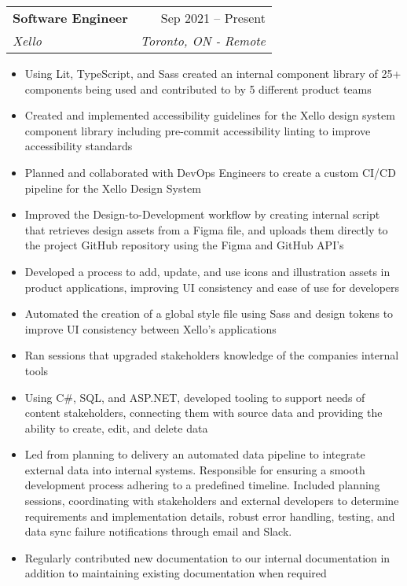 \documentclass[letterpaper,11pt]{article}
\makeatletter
\newcommand{\resumeItem}[1]{
  \item\small{
    {#1 \vspace{-2pt}}
  }
}
\newcommand{\resumeSubheading}[4]{
  \vspace{-2pt}\item
    \begin{tabular*}{0.97\textwidth}[t]{l@{\extracolsep{\fill}}r}
      \textbf{#1} & #2 \\
      \textit{\small#3} & \textit{\small #4} \\
    \end{tabular*}\vspace{-7pt}
}
\newcommand{\resumeSubSubheading}[2]{
    \item
    \begin{tabular*}{0.97\textwidth}{l@{\extracolsep{\fill}}r}
      \textit{\small#1} & \textit{\small #2} \\
    \end{tabular*}\vspace{-7pt}
}
\newcommand{\resumeSubHeadingListEnd}{\end{itemize}}
\newcommand{\resumeItemListStart}{\begin{itemize}}
\newcommand{\resumeItemListEnd}{\end{itemize}\vspace{-5pt}}
\makeatother
\begin{document}
    \resumeSubheading
      {Software Engineer}{Sep 2021 -- Present}
      {Xello}{Toronto, ON - Remote}
      \resumeItemListStart
        \resumeItem{Using Lit, TypeScript, and Sass created an internal component library of 25+ components being used and contributed to by 5 different product teams}
        \resumeItem{Created and implemented accessibility guidelines for the Xello design system component library including pre-commit accessibility linting to improve accessibility standards}
        \resumeItem{Planned and collaborated with DevOps Engineers to create a custom CI/CD pipeline for the Xello Design System}
        \resumeItem{Improved the Design-to-Development workflow by creating internal script that retrieves design assets from a Figma file, and uploads them directly to the project GitHub repository using the Figma and GitHub API's}
        \resumeItem{Developed a process to add, update, and use icons and illustration assets in product applications, improving UI consistency and ease of use for developers}
        \resumeItem{Automated the creation of a global style file using Sass and design tokens to improve UI consistency between Xello’s applications}
        \resumeItem{Ran sessions that upgraded stakeholders knowledge of the companies internal tools }
        \resumeItem{Using C\#, SQL, and ASP.NET, developed tooling to support needs of content stakeholders, connecting them with source data and providing the ability to create, edit, and delete data}
        \resumeItem{Led from planning to delivery an automated data pipeline to integrate external data into internal systems. Responsible for ensuring a smooth development process adhering to a predefined timeline. Included planning sessions, coordinating with stakeholders and external developers to determine requirements and implementation details, robust error handling, testing, and data sync failure notifications through email and Slack. }
        \resumeItem{Regularly contributed new documentation to our internal documentation in addition to maintaining existing documentation when required }
      \resumeItemListEnd
      
\end{document}
